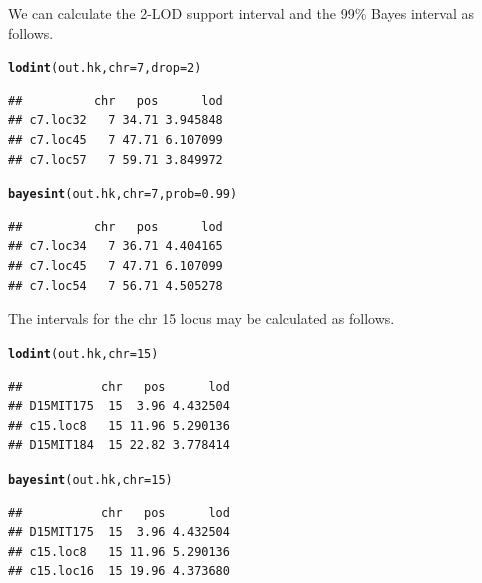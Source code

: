 \documentclass[12pt]{article}\usepackage[]{graphicx}\usepackage[]{color}
\makeatletter
\newcommand{\hlnum}[1]{\textcolor[rgb]{0.686,0.059,0.569}{#1}}%
\newcommand{\hlstd}[1]{\textcolor[rgb]{0.345,0.345,0.345}{#1}}%
\newcommand{\hlkwc}[1]{\textcolor[rgb]{0.333,0.667,0.333}{#1}}%
\newcommand{\hlkwd}[1]{\textcolor[rgb]{0.737,0.353,0.396}{\textbf{#1}}}%
\newenvironment{kframe}{%
 \def\at@end@of@kframe{}%
 \ifinner\ifhmode%
  \def\at@end@of@kframe{\end{minipage}}%
  \begin{minipage}{\columnwidth}%
 \fi\fi%
 \def\FrameCommand##1{\hskip\@totalleftmargin \hskip-\fboxsep
 \colorbox{shadecolor}{##1}\hskip-\fboxsep
     \hskip-\linewidth \hskip-\@totalleftmargin \hskip\columnwidth}%
 \MakeFramed {\advance\hsize-\width
   \@totalleftmargin\z@ \linewidth\hsize
   \@setminipage}}%
 {\par\unskip\endMakeFramed%
 \at@end@of@kframe}
\newenvironment{knitrout}{}{} %
\makeatother
\begin{document}
We can calculate the 2-LOD support interval and the 99\% Bayes
interval as follows.

\begin{knitrout}
\color{fgcolor}\begin{kframe}
\begin{alltt}
\hlkwd{lodint}\hlstd{(out.hk,} \hlkwc{chr}\hlstd{=}\hlnum{7}\hlstd{,} \hlkwc{drop}\hlstd{=}\hlnum{2}\hlstd{)}
\end{alltt}
\begin{verbatim}
##          chr   pos      lod
## c7.loc32   7 34.71 3.945848
## c7.loc45   7 47.71 6.107099
## c7.loc57   7 59.71 3.849972
\end{verbatim}
\begin{alltt}
\hlkwd{bayesint}\hlstd{(out.hk,} \hlkwc{chr}\hlstd{=}\hlnum{7}\hlstd{,} \hlkwc{prob}\hlstd{=}\hlnum{0.99}\hlstd{)}
\end{alltt}
\begin{verbatim}
##          chr   pos      lod
## c7.loc34   7 36.71 4.404165
## c7.loc45   7 47.71 6.107099
## c7.loc54   7 56.71 4.505278
\end{verbatim}
\end{kframe}
\end{knitrout}

The intervals for the chr 15 locus may be calculated as follows.

\begin{knitrout}
\color{fgcolor}\begin{kframe}
\begin{alltt}
\hlkwd{lodint}\hlstd{(out.hk,} \hlkwc{chr}\hlstd{=}\hlnum{15}\hlstd{)}
\end{alltt}
\begin{verbatim}
##           chr   pos      lod
## D15MIT175  15  3.96 4.432504
## c15.loc8   15 11.96 5.290136
## D15MIT184  15 22.82 3.778414
\end{verbatim}
\begin{alltt}
\hlkwd{bayesint}\hlstd{(out.hk,} \hlkwc{chr}\hlstd{=}\hlnum{15}\hlstd{)}
\end{alltt}
\begin{verbatim}
##           chr   pos      lod
## D15MIT175  15  3.96 4.432504
## c15.loc8   15 11.96 5.290136
## c15.loc16  15 19.96 4.373680
\end{verbatim}
\end{kframe}
\end{knitrout}
\end{document}
